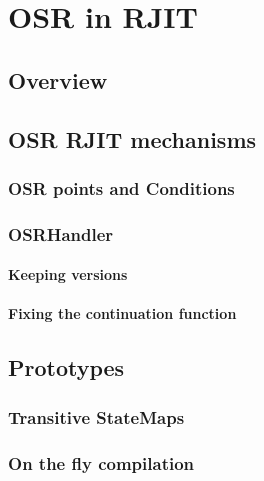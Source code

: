 
\chapter{OSR in RJIT} %

\label{Chapter4} %


\newcommand{\keyword}[1]{\textbf{#1}}
\newcommand{\tabhead}[1]{\textbf{#1}}
\newcommand{\code}[1]{\texttt{#1}}
\newcommand{\file}[1]{\texttt{\bfseries#1}}
\newcommand{\option}[1]{\texttt{\itshape#1}}

\section{Overview}
\section{OSR RJIT mechanisms}
\subsection{OSR points and Conditions}
\subsection{OSRHandler}
\subsubsection{Keeping versions}
\subsubsection{Fixing the continuation function}

\section{Prototypes}
\subsection{Transitive StateMaps}
\subsection{On the fly compilation}
